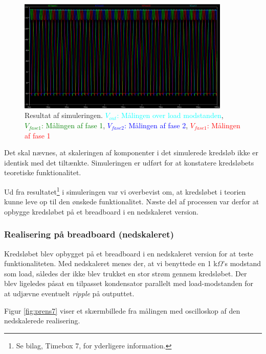 \begin{figure}[h]
  \centering
  \includegraphics[width=0.9\textwidth]{prens6.png}
  \caption{Resultat af simuleringen. \textcolor{cyan}{$V_{out}$: Målingen over load modstanden}, \textcolor{green}{$V_{fase1}$: Målingen af fase 1}, \textcolor{blue}{$V_{fase2}$: Målingen af fase 2}, \textcolor{red}{$V_{fase1}$: Målingen af fase 1}}
  \label{fig:prens6}
\end{figure}

Det skal nævnes, at skaleringen af komponenter i det simulerede kredsløb ikke er identisk med det tiltænkte. Simuleringen er udført for at konstatere kredsløbets teoretiske funktionalitet.   


Ud fra resultatet\footnote{Se bilag, Timebox 7, for yderligere information.} i simuleringen var vi overbevist om, at kredsløbet i teorien kunne leve op til den ønskede funktionalitet. Næste del af processen var derfor at opbygge kredsløbet på et breadboard i en nedskaleret version.

\subsubsection{Realisering på breadboard (nedskaleret)}
\label{sec:real-pa-breadb}

Kredsløbet blev opbygget på et breadboard i en nedskaleret version for at teste funktionaliteten. Med nedskaleret menes der, at vi benyttede en 1 k$\Omega$’s modstand som load, således der ikke blev trukket en stor strøm gennem kredsløbet. Der blev ligeledes påsat en tilpasset kondensator parallelt med load-modstanden for at udjævne eventuelt \textit{ripple} på outputtet. 

Figur \ref{fig:prens7} viser et skærmbillede fra målingen med oscilloskop af den nedskalerede realisering.

